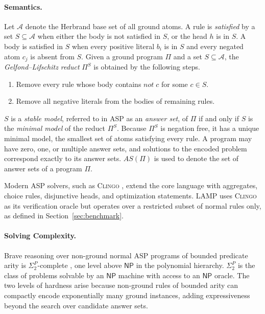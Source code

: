 \documentclass[11pt,a4paper]{article}
\begin{document}
\paragraph{Semantics.}
Let $\mathcal{A}$ denote the Herbrand base set of all ground atoms. A rule is \textit{satisfied} by a set $S \subseteq \mathcal{A}$ when either the body is not satisfied in $S$, or the head $h$ is in $S$. A body is satisfied in $S$ when every positive literal $b_i$ is in $S$ and every negated atom $c_j$ is absent from $S$. Given a ground program $\Pi$ and a set $S \subseteq \mathcal{A}$, the \textit{Gelfond--Lifschitz reduct} $\Pi^S$ is obtained by the following steps.
\begin{enumerate}
    \item Remove every rule whose body contains $\mathit{not}\; c$ for some $c \in S$.
    \item Remove all negative literals from the bodies of remaining rules.
\end{enumerate}
$S$ is a \textit{stable model}, referred to in ASP as an \textit{answer set}, of $\Pi$ if and only if $S$ is the \textit{minimal model} of the reduct $\Pi^S$. Because $\Pi^S$ is negation free, it has a unique minimal model, the smallest set of atoms satisfying every rule. A program may have zero, one, or multiple answer sets, and solutions to the encoded problem correspond exactly to its answer sets. $AS(\Pi)$ is used to denote the set of answer sets of a program $\Pi$.

Modern ASP solvers, such as \textsc{Clingo} \cite{gebser2014clingoasp}, extend the core language with aggregates, choice rules, disjunctive heads, and optimization statements. LAMP uses \textsc{Clingo} as its verification oracle but operates over a restricted subset of normal rules only, as defined in Section~\ref{sec:benchmark}.

\paragraph{Solving Complexity.}
Brave reasoning over non-ground normal ASP programs of bounded predicate arity is $\Sigma_2^P$-complete \cite{eiter2007complexityresultsboundedarity, bichler2016powernongroundrulesanswer}, one level above $\mathsf{NP}$ in the polynomial hierarchy. $\Sigma_2^P$ is the class of problems solvable by an $\mathsf{NP}$ machine with access to an $\mathsf{NP}$ oracle. The two levels of hardness arise because non-ground rules of bounded arity can compactly encode exponentially many ground instances, adding expressiveness beyond the search over candidate answer sets.
\end{document}
